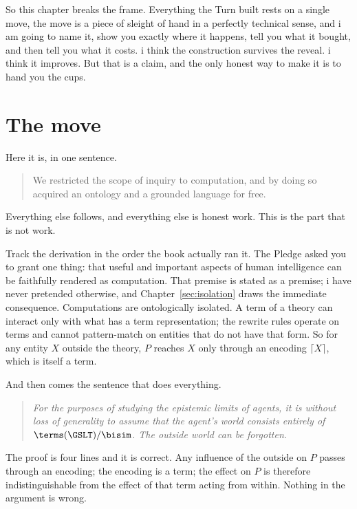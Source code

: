 So this chapter breaks the frame.
Everything the Turn built rests on a single move, the move is a
piece of sleight of hand in a perfectly technical sense, and i am
going to name it, show you exactly where it happens, tell you what
it bought, and then tell you what it costs.
i think the construction survives the reveal.
i think it improves.
But that is a claim, and the only honest way to make it is to hand
you the cups.

\section{The move}
\label{sec:the-move}

Here it is, in one sentence.

\begin{quote}
We restricted the scope of inquiry to computation, and by doing so
acquired an ontology and a grounded language for free.
\end{quote}

\noindent
Everything else follows, and everything else is honest work.
This is the part that is not work.

Track the derivation in the order the book actually ran it.
The Pledge asked you to grant one thing: that useful and important
aspects of human intelligence can be faithfully rendered as
computation.
That premise is stated as a premise; i have never pretended
otherwise, and Chapter~\ref{sec:isolation} draws the immediate
consequence.
Computations are ontologically isolated.
A term of a theory can interact only with what has a term
representation; the rewrite rules operate on terms and cannot
pattern-match on entities that do not have that form.
So for any entity $X$ outside the theory, $P$ reaches $X$ only
through an encoding $\lceil X \rceil$, which is itself a term.

And then comes the sentence that does everything.

\begin{quote}
\itshape For the purposes of studying the epistemic limits of
agents, it is without loss of generality to assume that the agent's
world consists entirely of $\terms(\GSLT)/{\bisim}$.
The outside world can be forgotten.
\end{quote}

\noindent
The proof is four lines and it is correct.
Any influence of the outside on $P$ passes through an encoding; the
encoding is a term; the effect on $P$ is therefore
indistinguishable from the effect of that term acting from within.
Nothing in the argument is wrong.

